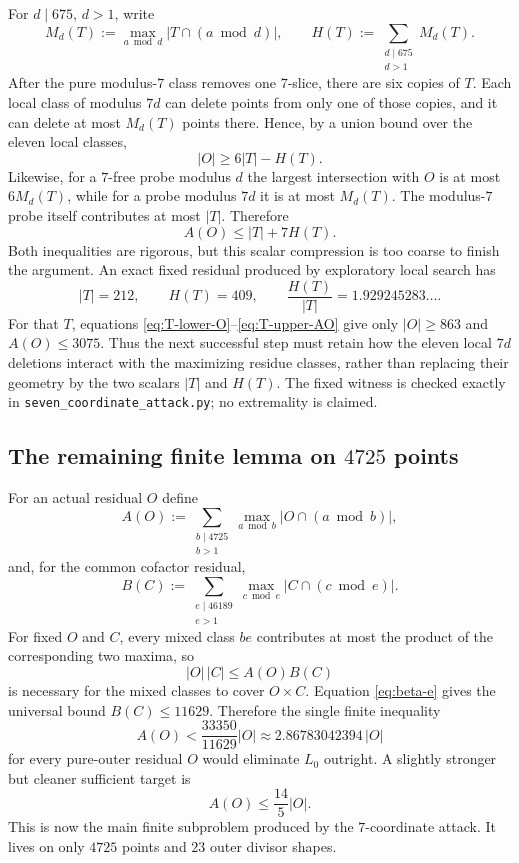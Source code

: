 \documentclass[11pt]{article}
\theoremstyle{definition}
\begin{document}
For $d\mid675$, $d>1$, write
\[
 M_d(T):=\max_{a\bmod d}|T\cap(a\bmod d)|,
 \qquad
 H(T):=\sum_{\substack{d\mid675\\d>1}}M_d(T).
\]
After the pure modulus-$7$ class removes one $7$-slice, there are six copies of $T$.  Each
local class of modulus $7d$ can delete points from only one of those copies, and it can delete
at most $M_d(T)$ points there.  Hence, by a union bound over the eleven local classes,
\begin{equation}\label{eq:T-lower-O}
 \boxed{|O|\ge6|T|-H(T).}
\end{equation}
Likewise, for a $7$-free probe modulus $d$ the largest intersection with $O$ is at most
$6M_d(T)$, while for a probe modulus $7d$ it is at most $M_d(T)$.  The modulus-$7$ probe
itself contributes at most $|T|$.  Therefore
\begin{equation}\label{eq:T-upper-AO}
 \boxed{A(O)\le |T|+7H(T).}
\end{equation}
Both inequalities are rigorous, but this scalar compression is too coarse to finish the
argument.  An exact fixed residual produced by exploratory local search has
\[
 |T|=212,
 \qquad H(T)=409,
 \qquad \frac{H(T)}{|T|}=1.929245283\ldots.
\]
For that $T$, equations \eqref{eq:T-lower-O}--\eqref{eq:T-upper-AO} give only
$|O|\ge863$ and $A(O)\le3075$.  Thus the next successful step must retain how the eleven
local $7d$ deletions interact with the maximizing residue classes, rather than replacing their
geometry by the two scalars $|T|$ and $H(T)$.  The fixed witness is checked exactly in
\texttt{seven\_coordinate\_attack.py}; no extremality is claimed.

\subsection{The remaining finite lemma on $4725$ points}

For an actual residual $O$ define
\[
 A(O):=
 \sum_{\substack{b\mid4725\\b>1}}
 \max_{a\bmod b}|O\cap(a\bmod b)|,
\]
and, for the common cofactor residual,
\[
 B(C):=
 \sum_{\substack{e\mid46189\\e>1}}
 \max_{c\bmod e}|C\cap(c\bmod e)|.
\]
For fixed $O$ and $C$, every mixed class $be$ contributes at most the product of the
corresponding two maxima, so
\begin{equation}\label{eq:AOBC}
 |O|\,|C|\le A(O)B(C)
\end{equation}
is necessary for the mixed classes to cover $O\times C$.
Equation \eqref{eq:beta-e} gives the universal bound $B(C)\le11629$.  Therefore the single
finite inequality
\begin{equation}\label{eq:outer-target}
 \boxed{
 A(O)<\frac{33350}{11629}|O|
 \approx2.86783042394\,|O|
 }
\end{equation}
for every pure-outer residual $O$ would eliminate $L_0$ outright.  A slightly stronger but
cleaner sufficient target is
\[
 A(O)\le\frac{14}{5}|O|.
\]
This is now the main finite subproblem produced by the $7$-coordinate attack.  It lives on only
$4725$ points and $23$ outer divisor shapes.
\end{document}
